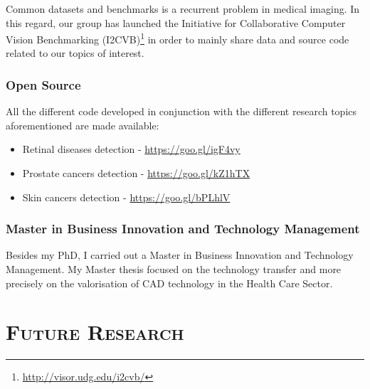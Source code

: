 \documentclass[a4paper]{article}
\begin{document}
Common datasets and benchmarks is a recurrent problem in medical imaging.
In this regard, our group has launched the Initiative for Collaborative Computer Vision Benchmarking (I2CVB)\footnote{\url{http://visor.udg.edu/i2cvb/}} in order to mainly share data and source code related to our topics of interest.

\subsubsection{Open Source}

All the different code developed in conjunction with the different research topics aforementioned are made available:

\begin{itemize}
\item Retinal diseases detection - \url{https://goo.gl/igF4vy}
\item Prostate cancers detection - \url{https://goo.gl/kZ1hTX}
\item Skin cancers detection - \url{https://goo.gl/bPLhlV}
\end{itemize}

\subsubsection{Master in Business Innovation and Technology Management}

Besides my PhD, I carried out a Master in Business Innovation and Technology Management.
My Master thesis focused on the technology transfer and more precisely on the valorisation of CAD technology in the Health Care Sector.

\section{\textsc{Future Research}} 
\end{document}
